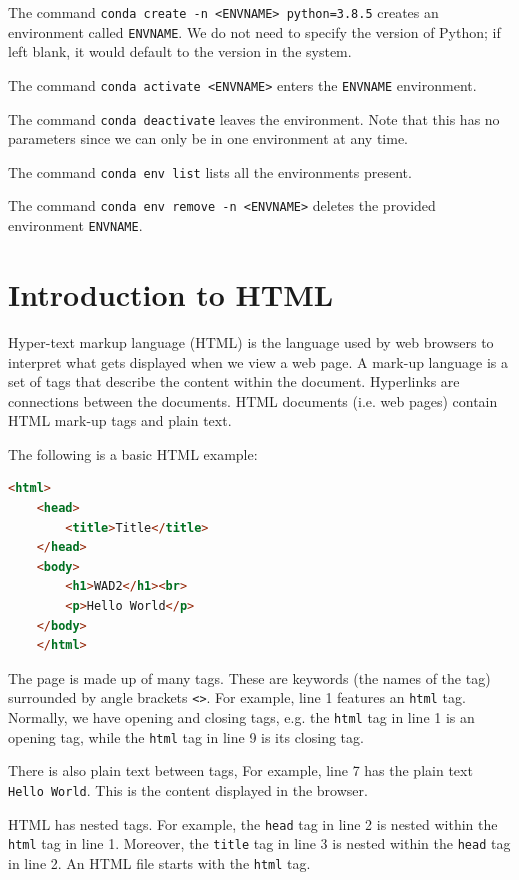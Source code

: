 \documentclass[a4paper, openany]{memoir}
\begin{document}
    \noindent The command \texttt{conda create -n <ENVNAME> python=3.8.5} creates an environment called \texttt{ENVNAME}. We do not need to specify the version of Python; if left blank, it would default to the version in the system.

    \noindent The command \texttt{conda activate <ENVNAME>} enters the \texttt{ENVNAME} environment.

    \noindent The command \texttt{conda deactivate} leaves the environment. Note that this has no parameters since we can only be in one environment at any time.

    \noindent The command \texttt{conda env list} lists all the environments present.

    \noindent The command \texttt{conda env remove -n <ENVNAME>} deletes the provided environment \texttt{ENVNAME}.
    \newpage

    \section{Introduction to HTML}
    Hyper-text markup language (HTML) is the language used by web browsers to interpret what gets displayed when we view a web page. A mark-up language is a set of tags that describe the content within the document. Hyperlinks are connections between the documents. HTML documents (i.e. web pages) contain HTML mark-up tags and plain text.

    \noindent The following is a basic HTML example:
    \begin{lstlisting}[language=html]
    <html>
    <head>
        <title>Title</title>
    </head>
    <body>
        <h1>WAD2</h1><br>
        <p>Hello World</p>
    </body>
    </html>
    \end{lstlisting}
    The page is made up of many tags. These are keywords (the names of the tag) surrounded by angle brackets \texttt{<>}. For example, line 1 features an \texttt{html} tag. Normally, we have opening and closing tags, e.g. the \texttt{html} tag in line 1 is an opening tag, while the \texttt{html} tag in line 9 is its closing tag.

    \noindent There is also plain text between tags, For example, line 7 has the plain text \texttt{Hello World}. This is the content displayed in the browser.

    \noindent HTML has nested tags. For example, the \texttt{head} tag in line 2 is nested within the \texttt{html} tag in line 1. Moreover, the \texttt{title} tag in line 3 is nested within the \texttt{head} tag in line 2. An HTML file starts with the \texttt{html} tag.
\end{document}
